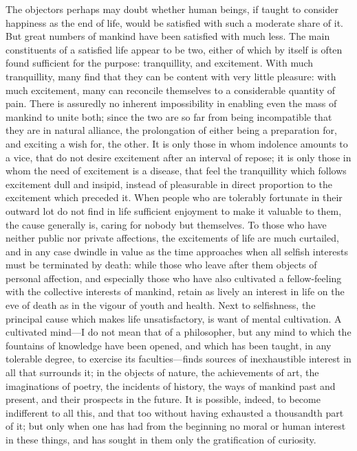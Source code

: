 The objectors perhaps may doubt whether human beings, if taught to
consider happiness as the end of life, would be satisfied with such a
moderate share of it. But great numbers of mankind have been satisfied
with much less. The main constituents of a satisfied life appear to be
two, either of which by itself is often found sufficient for the
purpose: tranquillity, and excitement. With much tranquillity, many
find that they can be content with very little pleasure: with much
excitement, many can reconcile themselves to a considerable quantity
of pain. There is assuredly no inherent impossibility in enabling even
the mass of mankind to unite both; since the two are so far from being
incompatible that they are in natural alliance, the prolongation of
either being a preparation for, and exciting a wish for, the other. It
is only those in whom indolence amounts to a vice, that do not desire
excitement after an interval of repose; it is only those in whom the
need of excitement is a disease, that feel the tranquillity which
follows excitement dull and insipid, instead of pleasurable in direct
proportion to the excitement which preceded it. When people who are
tolerably fortunate in their outward lot do not find in life
sufficient enjoyment to make it valuable to them, the cause generally
is, caring for \page{} nobody but themselves. To those who have
neither public nor private affections, the excitements of life are
much curtailed, and in any case dwindle in value as the time
approaches when all selfish interests must be terminated by death:
while those who leave after them objects of personal affection, and
especially those who have also cultivated a fellow-feeling with the
collective interests of mankind, retain as lively an interest in life
on the eve of death as in the vigour of youth and health. Next to
selfishness, the principal cause which makes life unsatisfactory, is
want of mental cultivation. A cultivated mind---I do not mean that of
a philosopher, but any mind to which the fountains of knowledge have
been opened, and which has been taught, in any tolerable degree, to
exercise its fac\-ul\-ties---finds sources of inexhaustible interest
in all that surrounds it; in the objects of nature, the achievements
of art, the imaginations of poetry, the incidents of history, the ways
of mankind past and present, and their prospects in the future. It is
possible, indeed, to become indifferent to all this, and that too
without having exhausted a thousandth part of it; but only when one
has had from the beginning no moral or human interest in these things,
and has sought in them only the gratification of curiosity.

